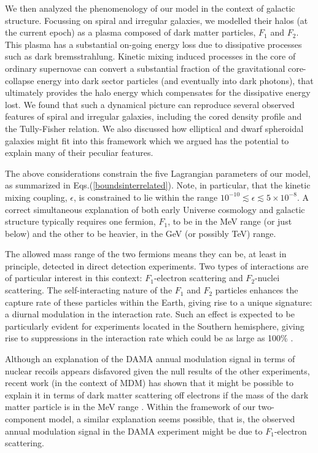 \documentclass[12pt]{article}
\begin{document}
{{We then analyzed the phenomenology of our model in the context of
galactic structure. 
Focussing on spiral and irregular galaxies, we modelled their halos (at
the current epoch) as a plasma 
composed of dark matter particles, $F_1$ and $F_2$.
This plasma has a substantial on-going energy loss due to dissipative
processes such as dark bremsstrahlung. Kinetic mixing
induced processes in the core of ordinary supernovae can convert a
substantial fraction of the gravitational core-collapse energy 
into dark sector particles (and eventually into dark photons), that
ultimately provides the halo energy which compensates for the
dissipative energy lost.
We found that such a dynamical picture can reproduce 
several observed features of spiral and irregular galaxies, including
the cored density profile and the Tully-Fisher relation. 
We also discussed how elliptical and dwarf spheroidal galaxies might fit
into this framework which we argued has the potential to
explain many of their peculiar features.

The above considerations constrain the five Lagrangian parameters of our
model, as summarized in Eqs.(\ref{boundsinterrelated}). 
Note, in particular, that the kinetic mixing coupling, $\epsilon$, is
constrained to lie within 
the range $10 ^{-10} \lesssim \epsilon \lesssim 5 \times 10 ^{-8}$. A
correct simultaneous explanation of both early Universe cosmology 
and galactic structure typically requires one fermion, $F_1$, to be in
the MeV range (or just below) and the other to be heavier, 
in the GeV (or possibly TeV) range. 

The allowed mass range of the two fermions means they can be, at least
in principle, detected in direct detection experiments. 
Two types of interactions are of particular interest in this context:
$F_1$-electron scattering and $F_2$-nuclei scattering. 
The self-interacting nature of the $F_1$ and $F_2$ particles enhances
the capture rate of these particles within the Earth, 
giving rise to a unique signature: a diurnal modulation in the
interaction rate. Such an effect is expected to be particularly 
evident for experiments located in the Southern hemisphere, giving rise
to suppressions in the interaction rate which could be as large as 100\%
\cite{mine}.

Although an explanation of the DAMA annual modulation signal
\cite{dama1} in terms of nuclear recoils appears disfavored given the
null results of the other experiments, recent work (in the context of
MDM) has shown that it might be possible to explain it in terms of dark
matter scattering off electrons if the mass of the dark matter particle
is in the MeV range \cite{electronscattering}. Within the framework of
our two-component model, a similar explanation seems possible, that is,
the observed annual modulation signal in the DAMA experiment might be
due to $F_1$-electron scattering.

}}
\end{document}
